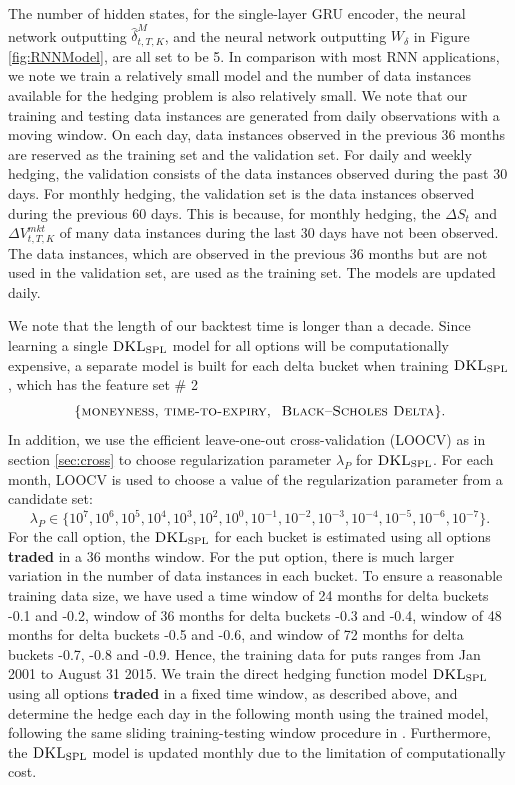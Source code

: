 \documentclass[letterpaper,12pt,titlepage,oneside,final]{book}
\numberwithin{equation}{section}
\theoremstyle{definition}
\newcommand{\DS}{\Delta S}
\newcommand{\DKLs}{\bf\textsc{DKL}_{\text{SPL}}}
\begin{document}
The number of hidden states, for the single-layer GRU encoder, the neural network outputting $\widehat{\delta}^M_{t,T,K}$, and the neural network outputting $W_{\delta}$  in Figure \ref{fig:RNNModel}, are all set to be 5.   In comparison with most RNN applications, we note we train a relatively small model and the number of data instances available for the hedging problem is also relatively small.
We note that our training and testing data instances are generated from daily observations with a moving window.  On each day, data instances observed in the previous 36 months are reserved as the training set and the validation set. For daily and weekly hedging, the validation consists of the data instances observed during the past 30 days. For monthly hedging, the validation set is the data instances observed during the previous 60 days. This is because, for monthly hedging, the  $\DS_t$ and $\Delta V^{mkt}_{t,T,K}$  of many data instances during the last 30 days have not been observed.
The data instances, which are observed in the previous 36 months but are not used in the validation set, are used as the training set.
The models are updated daily.





We note that the length of our backtest time is longer than a decade.
 Since
learning a single $\DKLs$ model for all options will be computationally expensive,   a separate model is built for each delta bucket when training $\DKLs$, which has the feature set \# 2
 $$\{\textsc{moneyness,~time-to-expiry,~ Black–Scholes Delta}\}.$$
 In addition,  we use the efficient leave-one-out cross-validation (LOOCV) as in section \ref{sec:cross} to choose regularization parameter $\lambda_P$ for $\DKLs$. For each month, LOOCV is used to choose a  value of the regularization parameter from a candidate set:
$$\lambda_P \in \{10^7,10^6,10^5,10^4,10^3,10^2,10^0,10^{-1},10^{-2}, 10^{-3},10^{-4},10^{-5},10^{-6},10^{-7} \}.$$
For the call option, the  $\DKLs$ for each bucket is estimated  using all options \textbf{traded} in a 36 months window. For the put option, there is much larger variation in the number of data instances in each bucket.
 To ensure a reasonable training data size, we have used a time window of 24 months for delta buckets -0.1 and -0.2,   window of 36 months for delta buckets -0.3 and -0.4,  window of 48 months  for delta buckets -0.5 and -0.6, and window of 72 months  for delta buckets -0.7, -0.8 and -0.9. Hence, the training data  for puts ranges from  Jan 2001 to August 31 2015.
We train the direct hedging function model $\DKLs$ using all options \textbf{traded} in a fixed time window, as described above, and determine the hedge each day in the following month using the trained model, following the same sliding training-testing window procedure in \citep{hulloptimal}. Furthermore, the  $\DKLs$  model is updated monthly due to the limitation of computationally cost.
\end{document}
